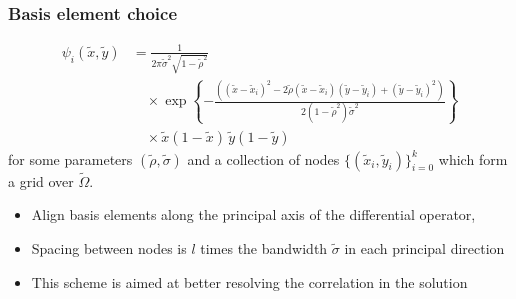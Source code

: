 \documentclass{beamer}
\begin{document}
\begin{frame}
  \frametitle{Basis element choice}
  \begin{align*}
    \psi_i(\tilde{x},\tilde{y}) &= \frac{1}{2\pi \tilde{\sigma}^2\sqrt{1-\tilde{\rho}^2} } \\
                                &\quad \times \exp\left\{ -\frac{\left( (\tilde{x} - \tilde{x}_i)^2 - 2\tilde{\rho} (\tilde{x}-\tilde{x}_i)(\tilde{y}-\tilde{y}_i) + (\tilde{y} - \tilde{y}_i)^2 \right)}{2(1-\tilde{\rho}^2)\tilde{\sigma}^2}  \right\} \nonumber \\
                                &\quad \times \tilde{x}\left(1-\tilde{x}\right)\, \tilde{y}(1-\tilde{y}) \nonumber
  \end{align*}
  for some parameters $(\tilde{\rho}, \tilde{\sigma})$ and a collection of nodes
  $\{ (\tilde{x}_i,\tilde{y}_i) \}_{i=0}^k$ which form a grid over
  $\tilde{\Omega}$.
  \begin{itemize}
  \item Align basis elements along the principal axis of the differential operator,
  \item Spacing between nodes is $l$ times the bandwidth $\tilde{\sigma}$ in each principal direction
  \item This scheme is aimed at better resolving the correlation in the solution
  \end{itemize}
\end{frame}
\end{document}
